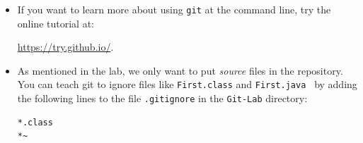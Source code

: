 \documentclass[11pt]{article}
\begin{document}
\begin{itemize}
\item If you want to learn more about using {\tt git} at the command line, try the online tutorial at:

\url{https://try.github.io/}.

\item As mentioned in the lab, we only want to put {\em source} files in the repository.  You can teach git to ignore files like {\tt First.class} and {\tt First.java~} by adding the following lines to the file {\tt .gitignore} in the {\tt Git-Lab} directory:

\begin{verbatim}
*.class
*~
\end{verbatim}

\end{itemize}
\end{document}
